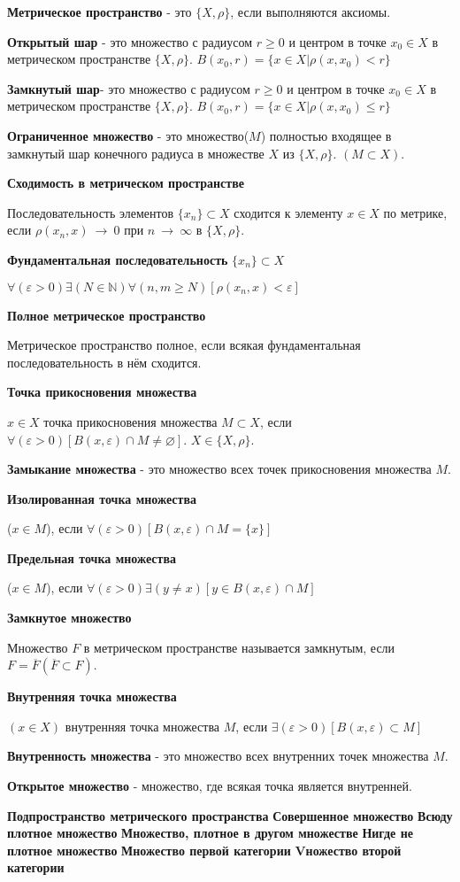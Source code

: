 \textbf{Метрическое пространство} - это $\{X,\rho\}$, если выполняются аксиомы.

\textbf{Открытый шар} - это множество с радиусом $r\geqslant 0$ и центром в точке $x_0\in X$ в метрическом пространстве  $\{X,\rho\}$.
$B(x_0,r)=\{x \in X|\rho(x,x_0)<r \}$

\textbf{Замкнутый шар}- это множество с радиусом $r\geqslant 0$ и центром в точке $x_0\in X$ в метрическом пространстве  $\{X,\rho\}$.
$B(x_0,r)=\{x \in X|\rho(x,x_0)\leqslant r \}$

\textbf{Ограниченное множество} - это множество($M$) полностью входящее в замкнутый шар конечного радиуса в множестве $X$ из $\{X,\rho\}$.
$(M \subset  X) $.

\textbf{Сходимость в метрическом пространстве}

Последовательность элементов $\{x_n\} \subset X$
сходится к элементу $x \in X$ по метрике,
если $\rho(x_n,x)~\longrightarrow~0$ при $n~\longrightarrow~\infty$ в $\{X,\rho\}$.

\textbf{Фундаментальная последовательность} $\{x_n\}\subset X$

$\forall(\varepsilon >0)\exists(N \in \mathbb{N})\forall(n,m\geqslant N)[\rho(x_n,x)<\varepsilon]$

\textbf{Полное метрическое пространство}

Метрическое пространство полное, если всякая фундаментальная последовательность в нём сходится.

\textbf{Точка прикосновения множества}

$x \in X$ точка прикосновения множества $M \subset X$, если $ \forall(\varepsilon>0)[B(x,\varepsilon)\cap M\neq \varnothing ]$. $X \in \{X,\rho\}$.

\textbf{Замыкание множества} - это множество всех точек прикосновения множества $M$.

\textbf{Изолированная точка множества}

($x \in M$), если $\forall(\varepsilon >0)[B(x,\varepsilon)\cap M = \{x\} ]$

\textbf{Предельная точка множества}

($x \in M$), если $ \forall(\varepsilon >0)\exists(y\neq x)[y \in B(x, \varepsilon)\cap M]$

\textbf{Замкнутое множество}

Множество $F$ в метрическом пространстве называется замкнутым, если $F=\overline{F}(\overline{F}\subset F)$.

\textbf{Внутренняя точка множества}

$(x \in X)$ внутренняя точка множества $M$, если $\exists(\varepsilon>0)[B(x,\varepsilon)\subset M]$

\textbf{Внутренность множества} - это множество всех внутренних точек множества $M$.

\textbf{Открытое множество} - множество, где всякая точка является внутренней.

\textbf{Подпространство метрического пространства}
\textbf{Совершенное множество}
\textbf{Всюду плотное множество}
\textbf{Множество, плотное в другом множестве}
\textbf{Нигде не плотное множество}
\textbf{Множество первой категории}
\textbf{Vножество второй категории}

